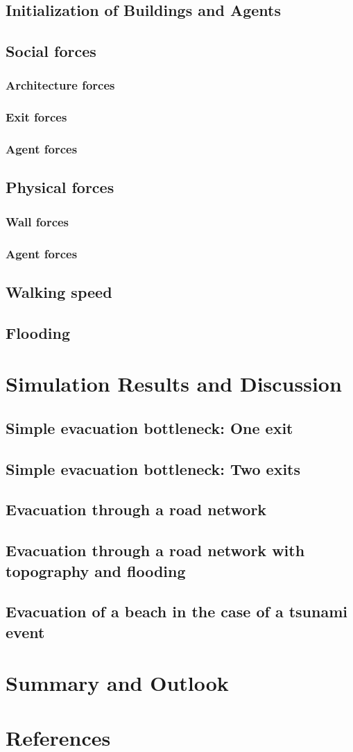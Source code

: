 \documentclass[11pt]{article}
\begin{document}
\subsection{Initialization of Buildings and Agents}
\subsection{Social forces}
\subsubsection{Architecture forces}
\subsubsection{Exit forces}
\subsubsection{Agent forces}
\subsection{Physical forces}
\subsubsection{Wall forces}
\subsubsection{Agent forces}
\subsection{Walking speed}
\subsection{Flooding}


\section{Simulation Results and Discussion}
\subsection{Simple evacuation bottleneck: One exit}
\subsection{Simple evacuation bottleneck: Two exits}
\subsection{Evacuation through a road network}
\subsection{Evacuation through a road network with topography and flooding}
\subsection{Evacuation of a beach in the case of a tsunami event}

\section{Summary and Outlook}

\section{References}
\end{document}
